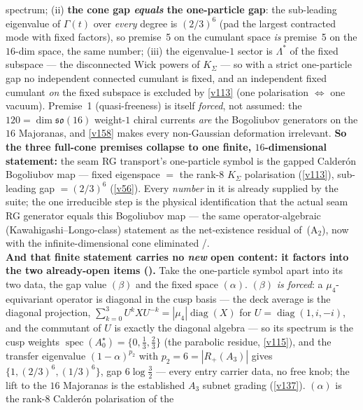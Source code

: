 \begin{keybox}
spectrum; (ii) \textbf{the cone gap \emph{equals} the one-particle gap}: the sub-leading eigenvalue of
$\Gamma(t)$ over \emph{every} degree is $(2/3)^6$ (pad the largest contracted mode with fixed factors), so
premise~5 on the cumulant space \emph{is} premise~5 on the $16$-dim space, the same number; (iii) the
eigenvalue-$1$ sector is $\Lambda^{*}$ of the fixed subspace --- the disconnected Wick powers of $K_\Sigma$
--- so with a strict one-particle gap no independent connected cumulant is fixed, and an independent fixed
cumulant \emph{on} the fixed subspace is excluded by \vref{v113} (one polarisation $\Leftrightarrow$ one
vacuum). Premise~1 (quasi-freeness) is itself \emph{forced}, not assumed: the $120=\dim\mathfrak{so}(16)$
weight-$1$ chiral currents \emph{are} the Bogoliubov generators on the $16$ Majoranas, and \vref{v158}
makes every non-Gaussian deformation irrelevant. \textbf{So the three full-cone premises collapse to one
finite, $16$-dimensional statement:} the seam RG transport's one-particle symbol is the gapped Calder\'on
Bogoliubov map --- fixed eigenspace $=$ the rank-$8$ $K_\Sigma$ polarisation (\vref{v113}), sub-leading gap
$=(2/3)^6$ (\vref{v56}). Every \emph{number} in it is already supplied by the suite; the one irreducible
step is the physical identification that the actual seam RG generator equals this Bogoliubov map --- the
same operator-algebraic (Kawahigashi--Longo-class) statement as the net-existence residual of~(A$_2$), now
with the infinite-dimensional cone eliminated \mE/\mO.
\smallskip\\
\noindent\textbf{And that finite statement carries no \emph{new} open content: it factors into the two
already-open items ().} Take the one-particle symbol apart
into its two data, the gap value $(\beta)$ and the fixed space $(\alpha)$. $(\beta)$ \emph{is forced}: a
$\mu_4$-equivariant operator is diagonal in the cusp basis --- the deck average is the diagonal projection,
$\sum_{k=0}^{3}U^kXU^{-k}=|\mu_4|\operatorname{diag}(X)$ for $U=\operatorname{diag}(1,i,-i)$, and the
commutant of $U$ is exactly the diagonal algebra --- so its spectrum is the cusp weights
$\operatorname{spec}(A_0^\star)=\{0,\tfrac13,\tfrac23\}$ (the parabolic residue, \vref{v115}), and the
transfer eigenvalue $(1{-}\alpha)^{p_2}$ with $p_2{=}6{=}|R_+(A_3)|$ gives $\{1,(2/3)^6,(1/3)^6\}$, gap
$6\log\tfrac32$ --- every entry carrier data, no free knob; the lift to the $16$ Majoranas is the
established $A_3$ subnet grading (\vref{v137}). $(\alpha)$ is the rank-$8$ Calder\'on polarisation of the

\end{keybox}
